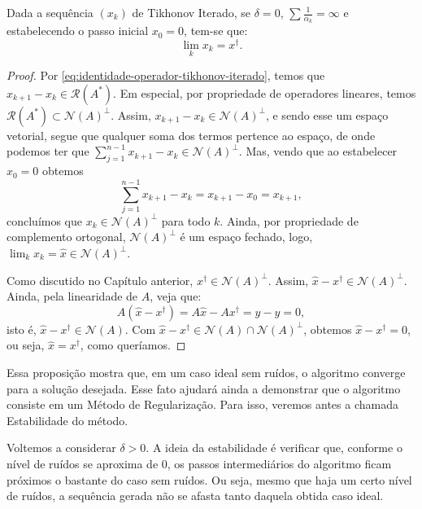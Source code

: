 \begin{prop}
    Dada a sequência $(x_k)$ de Tikhonov Iterado, se $\delta=0$, $\sum \frac{1}{\alpha_k}=\infty$ e estabelecendo o passo inicial $x_0=0$, tem-se que:
    \[
        \lim_k x_k = x^\dag.
    \]
\end{prop}
\begin{proof}
    
Por \eqref{eq:identidade-operador-tikhonov-iterado}, temos que $x_{k+1}-x_k \in \mathcal R(A^*)$. Em especial, por propriedade de operadores lineares, temos $\mathcal R(A^*) \subset \mathcal N(A)^\perp$. Assim, $x_{k+1}-x_k \in \mathcal N(A)^\perp$, e sendo esse um espaço vetorial, segue que qualquer soma dos termos pertence ao espaço, de onde podemos ter que $\sum_{j=1}^{n-1} x_{k+1} - x_k \in \mathcal N(A)^\perp$. Mas, vendo que ao estabelecer $x_0=0$ obtemos
\[
\sum_{j=1}^{n-1} x_{k+1} - x_k = x_{k+1}-x_0 = x_{k+1},
\]
concluímos que $x_k\in \mathcal N(A)^\perp$ para todo $k$. Ainda, por propriedade de complemento ortogonal, $\mathcal N(A)^\perp$ é um espaço fechado, logo, $\lim_k x_k = \hat x \in \mathcal N(A)^\perp$. 

Como discutido no Capítulo anterior, $x^\dag \in \mathcal N(A)^\perp$. Assim, $\hat x - x^\dag \in \mathcal N(A)^\perp$. Ainda, pela linearidade de $A$, veja que:
\[
A(\hat x - x^\dag) = A\hat x - Ax^\dag = y-y = 0,
\]
isto é, $\hat x - x^\dag \in \mathcal N(A)$. Com $\hat x - x^\dag \in \mathcal N(A)\cap \mathcal N(A)^\perp$, obtemos $\hat x - x^\dag = 0$, ou seja, $\hat x=x^\dag$, como queríamos.

\end{proof}

Essa proposição mostra que, em um caso ideal sem ruídos, o algoritmo converge para a solução desejada. Esse fato ajudará ainda a demonstrar que o algoritmo consiste em um Método de Regularização. Para isso, veremos antes a chamada Estabilidade do método.

Voltemos a considerar $\delta>0$. A ideia da estabilidade é verificar que, conforme o nível de ruídos se aproxima de 0, os passos intermediários do algoritmo ficam próximos o bastante do caso sem ruídos. Ou seja, mesmo que haja um certo nível de ruídos, a sequência gerada não se afasta tanto daquela obtida caso ideal. 

